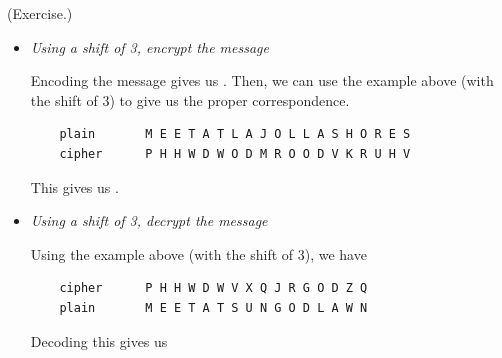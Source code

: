 \documentclass[letterpaper]{article}
\newcommand{\0}{\mathbf{0}}
\begin{document}
\begin{mdframed}
    (Exercise.) 
    \begin{itemize}
        \item \emph{Using a shift of 3, encrypt the message }
        \begin{mdframed}
            Encoding the message gives us . Then, we can use the example above (with the shift of 3) to give us the proper correspondence.
            \begin{verbatim}
    plain       M E E T A T L A J O L L A S H O R E S
    cipher      P H H W D W O D M R O O D V K R U H V\end{verbatim}
            This gives us .
        \end{mdframed}
        \item \emph{Using a shift of 3, decrypt the message }
        \begin{mdframed}
            Using the example above (with the shift of 3), we have
            \begin{verbatim}
    cipher      P H H W D W V X Q J R G O D Z Q
    plain       M E E T A T S U N G O D L A W N\end{verbatim}
            Decoding this gives us 
        \end{mdframed}
    \end{itemize}
\end{mdframed}
\end{document}
